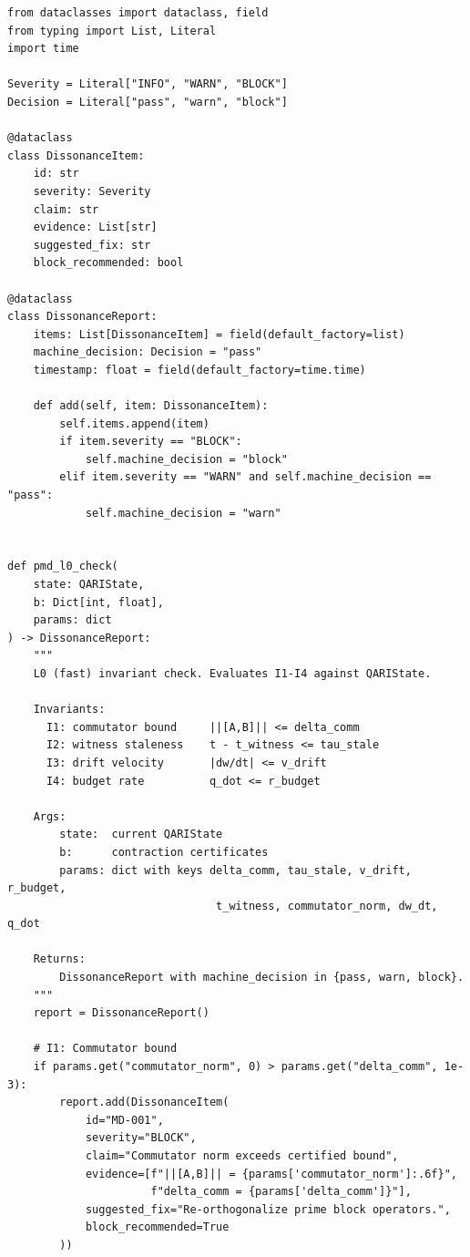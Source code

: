 \documentclass[12pt,letterpaper]{article}
\begin{document}
\begin{lstlisting}[caption={PMD: callable L0 invariant check returning
                   dissonance report},
                   label={lst:pmd}]
from dataclasses import dataclass, field
from typing import List, Literal
import time

Severity = Literal["INFO", "WARN", "BLOCK"]
Decision = Literal["pass", "warn", "block"]

@dataclass
class DissonanceItem:
    id: str
    severity: Severity
    claim: str
    evidence: List[str]
    suggested_fix: str
    block_recommended: bool

@dataclass
class DissonanceReport:
    items: List[DissonanceItem] = field(default_factory=list)
    machine_decision: Decision = "pass"
    timestamp: float = field(default_factory=time.time)

    def add(self, item: DissonanceItem):
        self.items.append(item)
        if item.severity == "BLOCK":
            self.machine_decision = "block"
        elif item.severity == "WARN" and self.machine_decision == "pass":
            self.machine_decision = "warn"


def pmd_l0_check(
    state: QARIState,
    b: Dict[int, float],
    params: dict
) -> DissonanceReport:
    """
    L0 (fast) invariant check. Evaluates I1-I4 against QARIState.

    Invariants:
      I1: commutator bound     ||[A,B]|| <= delta_comm
      I2: witness staleness    t - t_witness <= tau_stale
      I3: drift velocity       |dw/dt| <= v_drift
      I4: budget rate          q_dot <= r_budget

    Args:
        state:  current QARIState
        b:      contraction certificates
        params: dict with keys delta_comm, tau_stale, v_drift, r_budget,
                                t_witness, commutator_norm, dw_dt, q_dot

    Returns:
        DissonanceReport with machine_decision in {pass, warn, block}.
    """
    report = DissonanceReport()

    # I1: Commutator bound
    if params.get("commutator_norm", 0) > params.get("delta_comm", 1e-3):
        report.add(DissonanceItem(
            id="MD-001",
            severity="BLOCK",
            claim="Commutator norm exceeds certified bound",
            evidence=[f"||[A,B]|| = {params['commutator_norm']:.6f}",
                      f"delta_comm = {params['delta_comm']}"],
            suggested_fix="Re-orthogonalize prime block operators.",
            block_recommended=True
        ))


\end{lstlisting}
\end{document}
